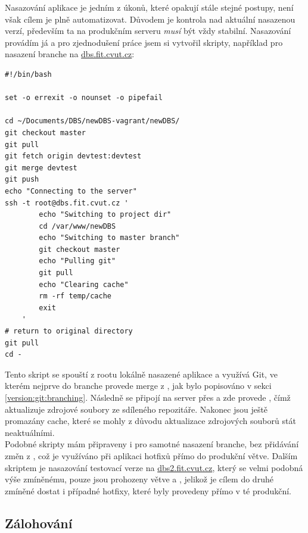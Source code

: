 Nasazování aplikace je jedním z úkonů, které opakují stále stejné postupy, není však cílem je plně automatizovat. Důvodem je kontrola nad aktuální nasazenou verzí, především ta na produkčním serveru \emph{musí} být vždy stabilní. Nasazování provádím já a pro zjednodušení práce jsem si vytvořil skripty, například pro nasazení  branche na \url{dbs.fit.cvut.cz}:
\begin{verbatim}
#!/bin/bash

set -o errexit -o nounset -o pipefail

cd ~/Documents/DBS/newDBS-vagrant/newDBS/
git checkout master
git pull
git fetch origin devtest:devtest
git merge devtest
git push
echo "Connecting to the server"
ssh -t root@dbs.fit.cvut.cz '
        echo "Switching to project dir"
        cd /var/www/newDBS
        echo "Switching to master branch"
        git checkout master
        echo "Pulling git"
        git pull
        echo "Clearing cache"
        rm -rf temp/cache
        exit
    '
# return to original directory
git pull
cd -
\end{verbatim}
Tento skript se spouští z rootu lokálně nasazené aplikace a využívá Git, ve kterém nejprve do  branche provede merge z , jak bylo popisováno v sekci \ref{version:git:branching}. Následně se připojí na server přes  a zde provede , čímž aktualizuje zdrojové soubory ze sdíleného repozitáře. Nakonec jsou ještě promazány cache, které se mohly z důvodu aktualizace zdrojových souborů stát neaktuálními.\\
Podobné skripty mám připraveny i pro samotné nasazení  branche, bez přidávání změn z , což je využíváno při aplikaci hotfixů přímo do produkční větve. Dalším skriptem je nasazování testovací verze na \url{dbs2.fit.cvut.cz}, který se velmi podobná výše zmíněnému, pouze jsou prohozeny větve  a , jelikož je cílem do druhé zmíněné dostat i případné hotfixy, které byly provedeny přímo v té produkční.

\subsection{Zálohování}


